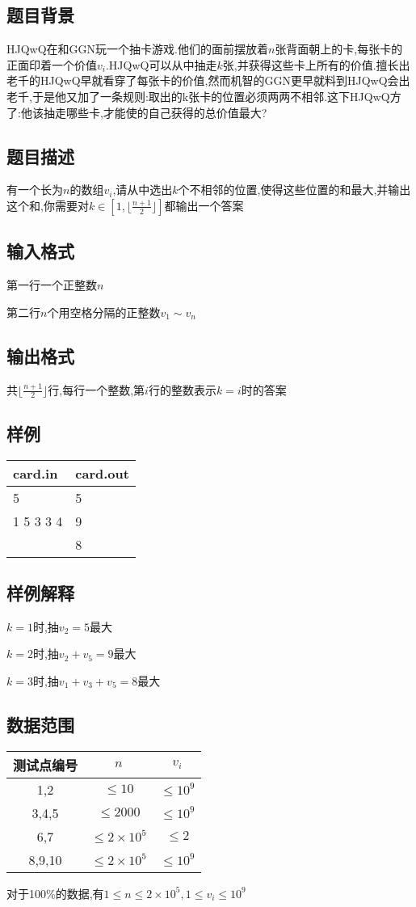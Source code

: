 \documentclass[12pt]{ctexart}
\begin{document}
\subsection{题目背景}
HJQwQ在和GGN玩一个抽卡游戏.他们的面前摆放着$n$张背面朝上的卡,每张卡的正面印着一个价值$v_i$.HJQwQ可以从中抽走$k$张,并获得这些卡上所有的价值.擅长出老千的HJQwQ早就看穿了每张卡的价值,然而机智的GGN更早就料到HJQwQ会出老千,于是他又加了一条规则:取出的k张卡的位置必须两两不相邻.这下HJQwQ方了:他该抽走哪些卡,才能使的自己获得的总价值最大?
\subsection{题目描述}
有一个长为$n$的数组$v_i$,请从中选出$k$个不相邻的位置,使得这些位置的和最大,并输出这个和,你需要对$k\in\left[1,\lfloor\frac{n+1}{2}\rfloor\right]$都输出一个答案
\subsection{输入格式}
第一行一个正整数$n$

第二行$n$个用空格分隔的正整数$v_1\sim v_n$
\subsection{输出格式}
共$\lfloor\frac{n+1}{2}\rfloor$行,每行一个整数,第$i$行的整数表示$k=i$时的答案
\subsection{样例}
\begin{center}
	\begin{tabular}{|p{6cm}|p{6cm}|}
		\hline card.in&card.out\\
		\hline	5&5\\
				1 5 3 3 4&9\\
				&8\\
		\hline
	\end{tabular}
\end{center}
\subsection{样例解释}
$k=1$时,抽$v_2=5$最大

$k=2$时,抽$v_2+v_5=9$最大

$k=3$时,抽$v_1+v_3+v_5=8$最大
\subsection{数据范围}
\begin{center}
	\begin{tabular}{|c|c|c|}
		\hline 测试点编号&$n$&$v_i$\\
		\hline 1,2&$\le10$&$\le10^9$\\
		\hline 3,4,5&$\le2000$&$\le10^9$\\
		\hline 6,7&$\le2\times10^5$&$\le2$\\
		\hline 8,9,10&$\le2\times10^5$&$\le10^9$\\
		\hline
	\end{tabular}
\end{center}
对于100\%的数据,有$1\le n\le2\times10^5,1\le v_i\le10^9$
\newpage
\end{document}
